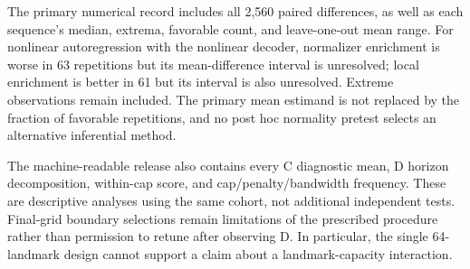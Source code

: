 The primary numerical record includes all 2,560 paired differences, as well as each sequence's median, extrema, favorable count, and leave-one-out mean range. For nonlinear autoregression with the nonlinear decoder, normalizer enrichment is worse in 63 repetitions but its mean-difference interval is unresolved; local enrichment is better in 61 but its interval is also unresolved. Extreme observations remain included. The primary mean estimand is not replaced by the fraction of favorable repetitions, and no post hoc normality pretest selects an alternative inferential method.

The machine-readable release also contains every C diagnostic mean, D horizon decomposition, within-cap score, and cap/penalty/bandwidth frequency. These are descriptive analyses using the same cohort, not additional independent tests. Final-grid boundary selections remain limitations of the prescribed procedure rather than permission to retune after observing D. In particular, the single 64-landmark design cannot support a claim about a landmark-capacity interaction.
